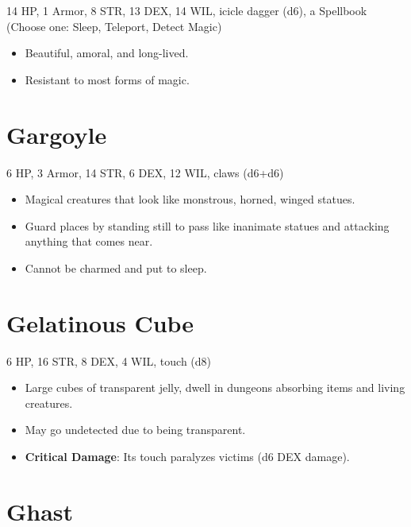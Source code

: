 \documentclass[
  10pt,
  american,
]{article}
\begin{document}
14 HP, 1 Armor, 8 STR, 13 DEX, 14 WIL, icicle dagger (d6), a Spellbook
(Choose one: Sleep, Teleport, Detect Magic)

\begin{samepage}
\begin{itemize}
\setlength\itemsep{-.5em}
\item Beautiful, amoral, and long-lived.
\item Resistant to most forms of magic.
\end{itemize}
\end{samepage}

\hypertarget{gargoyle}{%
\section{Gargoyle}\label{gargoyle}}

6 HP, 3 Armor, 14 STR, 6 DEX, 12 WIL, claws (d6+d6)

\begin{samepage}
\begin{itemize}
\setlength\itemsep{-.5em}
\item Magical creatures that look like monstrous, horned, winged statues.
\item Guard places by standing still to pass like inanimate statues and attacking anything that comes near.
\item Cannot be charmed and put to sleep.
\end{itemize}
\end{samepage}

\hypertarget{gelatinous-cube}{%
\section{Gelatinous Cube}\label{gelatinous-cube}}

6 HP, 16 STR, 8 DEX, 4 WIL, touch (d8)

\begin{samepage}
\begin{itemize}
\setlength\itemsep{-.5em}
\item Large cubes of transparent jelly, dwell in dungeons absorbing items and living creatures.
\item May go undetected due to being transparent.
\item \textbf{Critical Damage}: Its touch paralyzes victims (d6 DEX damage).
\end{itemize}
\end{samepage}

\hypertarget{ghast}{%
\section{Ghast}\label{ghast}}
\end{document}

